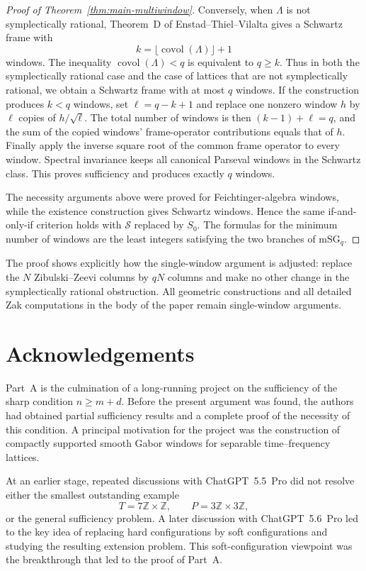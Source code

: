 \documentclass[11pt,reqno]{amsart}
\numberwithin{equation}{section}
\theoremstyle{definition}
\theoremstyle{remark}
\newcommand{\covol}{\operatorname{covol}}
\newcommand{\Sclass}{\mathcal S}
\newcommand{\mSG}{\mathrm{mSG}}
\newcommand{\Szero}{S_0}
\begin{document}
\begin{proof}[Proof of Theorem~\ref{thm:main-multiwindow}]
Conversely, when $\Lambda$ is not symplectically rational, Theorem~D of
Enstad--Thiel--Vilalta gives a Schwartz frame with
\[
                         k=\lfloor\covol(\Lambda)\rfloor+1
\]
windows.  The inequality $\covol(\Lambda)<q$ is equivalent to $q\ge k$.
Thus in both the symplectically rational case and the case of lattices
that are not symplectically rational, we obtain a Schwartz frame
with at most $q$ windows.  If the construction produces $k<q$ windows, set
$\ell=q-k+1$ and replace one nonzero window $h$ by $\ell$ copies of
$h/\sqrt{\ell}$.  The total number of windows is then
$(k-1)+\ell=q$, and the sum of the copied windows' frame-operator
contributions equals that of $h$.  Finally apply the inverse square root of the common frame operator to
every window.  Spectral invariance keeps all canonical Parseval windows in
the Schwartz class.  This proves sufficiency and produces exactly $q$
windows.

The necessity arguments above were proved for Feichtinger-algebra windows,
while the existence construction gives Schwartz windows.  Hence the same
if-and-only-if criterion holds with $\Sclass$ replaced by $\Szero$.  The
formulas for the minimum number of windows are the least integers satisfying
the two branches of $\mSG_q$.
\end{proof}

The proof shows explicitly how the single-window argument is adjusted:
replace the $N$ Zibulski--Zeevi columns by $qN$ columns and make no other change in the
symplectically rational obstruction.  All geometric constructions and all detailed Zak
computations in the body of the paper remain single-window arguments.


\section*{Acknowledgements}
Part~A is the culmination of a long-running project on the sufficiency of the
sharp condition $n\ge m+d$.  Before the present argument was found, the
authors had obtained partial sufficiency results and a complete proof of the
necessity of this condition.  A principal motivation for the project was the
construction of compactly supported smooth Gabor windows for separable
time--frequency lattices.

At an earlier stage, repeated discussions with ChatGPT~5.5~Pro did not
resolve either the smallest outstanding example
\[
 T=7\mathbb Z\times\mathbb Z,
 \qquad
 P=3\mathbb Z\times 3\mathbb Z,
\]
or the general sufficiency problem.  A later discussion with
ChatGPT~5.6~Pro led to the key idea of replacing hard configurations by soft
configurations and studying the resulting extension problem.  This
soft-configuration viewpoint was the breakthrough that led to the proof of
Part~A.
\end{document}

